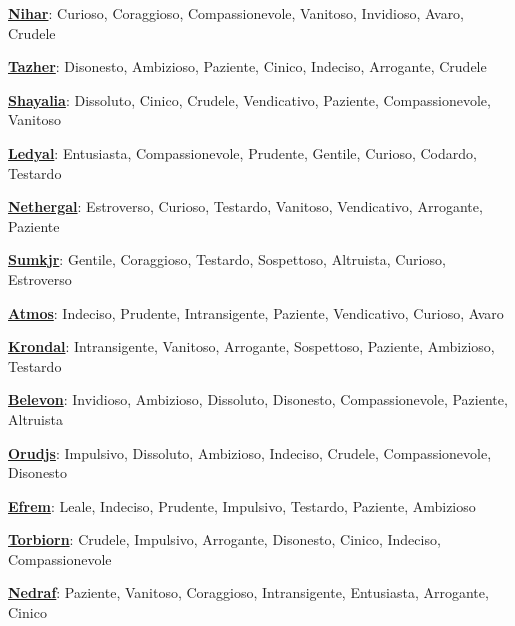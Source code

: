 \begin{multicols}{2}
{\smallskip

\textbf{\hyperlink{nihar}{Nihar}}: Curioso, Coraggioso, Compassionevole, Vanitoso, Invidioso, Avaro, Crudele

\smallskip

\textbf{\hyperlink{tazher}{Tazher}}: Disonesto, Ambizioso, Paziente, Cinico, Indeciso, Arrogante, Crudele

\smallskip

\textbf{\hyperlink{shayalia}{Shayalia}}: Dissoluto, Cinico, Crudele, Vendicativo, Paziente, Compassionevole, Vanitoso

\smallskip

\textbf{\hyperlink{ledyal}{Ledyal}}: Entusiasta, Compassionevole, Prudente, Gentile, Curioso, Codardo, Testardo

\smallskip

\textbf{\hyperlink{nethergal}{Nethergal}}: Estroverso, Curioso, Testardo, Vanitoso, Vendicativo, Arrogante, Paziente

\smallskip

\textbf{\hyperlink{sumkjr}{Sumkjr}}: Gentile, Coraggioso, Testardo, Sospettoso, Altruista, Curioso, Estroverso

\smallskip

\textbf{\hyperlink{atmos}{Atmos}}: Indeciso, Prudente, Intransigente, Paziente, Vendicativo, Curioso, Avaro

\smallskip

\textbf{\hyperlink{krondal}{Krondal}}: Intransigente, Vanitoso, Arrogante, Sospettoso, Paziente, Ambizioso, Testardo

\smallskip

\textbf{\hyperlink{belevon}{Belevon}}: Invidioso, Ambizioso, Dissoluto, Disonesto, Compassionevole, Paziente, Altruista

\smallskip

\textbf{\hyperlink{orudjs}{Orudjs}}: Impulsivo, Dissoluto, Ambizioso, Indeciso, Crudele, Compassionevole, Disonesto

\smallskip

\textbf{\hyperlink{efrem}{Efrem}}: Leale, Indeciso, Prudente, Impulsivo, Testardo, Paziente, Ambizioso

\smallskip

\textbf{\hyperlink{torbiorn}{Torbiorn}}: Crudele, Impulsivo, Arrogante, Disonesto, Cinico, Indeciso, Compassionevole

\smallskip

\textbf{\hyperlink{nedraf}{Nedraf}}: Paziente, Vanitoso, Coraggioso, Intransigente, Entusiasta, Arrogante, Cinico

}
\end{multicols}
